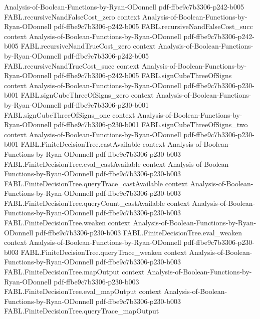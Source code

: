 \begin{theorem}
  {Analysis-of-Boolean-Functions-by-Ryan-ODonnell}
  {pdf-ffbe9c7b3306-p242-b005}
\proofstep
  {FABL.recursiveNandFalseCost_zero}
  {context}
  {Analysis-of-Boolean-Functions-by-Ryan-ODonnell}
  {pdf-ffbe9c7b3306-p242-b005}
\proofstep
  {FABL.recursiveNandFalseCost_succ}
  {context}
  {Analysis-of-Boolean-Functions-by-Ryan-ODonnell}
  {pdf-ffbe9c7b3306-p242-b005}
\proofstep
  {FABL.recursiveNandTrueCost_zero}
  {context}
  {Analysis-of-Boolean-Functions-by-Ryan-ODonnell}
  {pdf-ffbe9c7b3306-p242-b005}
\proofstep
  {FABL.recursiveNandTrueCost_succ}
  {context}
  {Analysis-of-Boolean-Functions-by-Ryan-ODonnell}
  {pdf-ffbe9c7b3306-p242-b005}
\proofstep
  {FABL.signCubeThreeOfSigns}
  {context}
  {Analysis-of-Boolean-Functions-by-Ryan-ODonnell}
  {pdf-ffbe9c7b3306-p230-b001}
\proofstep
  {FABL.signCubeThreeOfSigns_zero}
  {context}
  {Analysis-of-Boolean-Functions-by-Ryan-ODonnell}
  {pdf-ffbe9c7b3306-p230-b001}
\proofstep
  {FABL.signCubeThreeOfSigns_one}
  {context}
  {Analysis-of-Boolean-Functions-by-Ryan-ODonnell}
  {pdf-ffbe9c7b3306-p230-b001}
\proofstep
  {FABL.signCubeThreeOfSigns_two}
  {context}
  {Analysis-of-Boolean-Functions-by-Ryan-ODonnell}
  {pdf-ffbe9c7b3306-p230-b001}
\proofstep
  {FABL.FiniteDecisionTree.castAvailable}
  {context}
  {Analysis-of-Boolean-Functions-by-Ryan-ODonnell}
  {pdf-ffbe9c7b3306-p230-b003}
\proofstep
  {FABL.FiniteDecisionTree.eval_castAvailable}
  {context}
  {Analysis-of-Boolean-Functions-by-Ryan-ODonnell}
  {pdf-ffbe9c7b3306-p230-b003}
\proofstep
  {FABL.FiniteDecisionTree.queryTrace_castAvailable}
  {context}
  {Analysis-of-Boolean-Functions-by-Ryan-ODonnell}
  {pdf-ffbe9c7b3306-p230-b003}
\proofstep
  {FABL.FiniteDecisionTree.queryCount_castAvailable}
  {context}
  {Analysis-of-Boolean-Functions-by-Ryan-ODonnell}
  {pdf-ffbe9c7b3306-p230-b003}
\proofstep
  {FABL.FiniteDecisionTree.weaken}
  {context}
  {Analysis-of-Boolean-Functions-by-Ryan-ODonnell}
  {pdf-ffbe9c7b3306-p230-b003}
\proofstep
  {FABL.FiniteDecisionTree.eval_weaken}
  {context}
  {Analysis-of-Boolean-Functions-by-Ryan-ODonnell}
  {pdf-ffbe9c7b3306-p230-b003}
\proofstep
  {FABL.FiniteDecisionTree.queryTrace_weaken}
  {context}
  {Analysis-of-Boolean-Functions-by-Ryan-ODonnell}
  {pdf-ffbe9c7b3306-p230-b003}
\proofstep
  {FABL.FiniteDecisionTree.mapOutput}
  {context}
  {Analysis-of-Boolean-Functions-by-Ryan-ODonnell}
  {pdf-ffbe9c7b3306-p230-b003}
\proofstep
  {FABL.FiniteDecisionTree.eval_mapOutput}
  {context}
  {Analysis-of-Boolean-Functions-by-Ryan-ODonnell}
  {pdf-ffbe9c7b3306-p230-b003}
\proofstep
  {FABL.FiniteDecisionTree.queryTrace_mapOutput}

\end{theorem}
